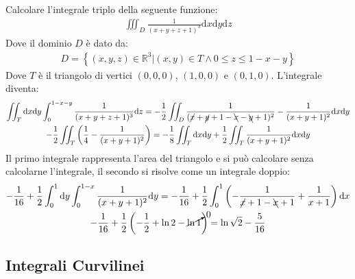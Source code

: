 \documentclass{article}
\newcommand{\df}{\mathrm{d}}
\numberwithin{equation}{subsection}
\begin{document}
Calcolare l'integrale triplo della seguente funzione:
\begin{gather*}
    \iiint_D\frac{1}{(x+y+z+1)^3}\df x\df y\df z
\end{gather*}
Dove il dominio $D$ è dato da:
\begin{gather*}
    D=\left\{(x,y,z)\in\mathbb{R}^3\big|(x,y)\in T\land0\leq z\leq 1-x-y\right\}
\end{gather*}
Dove $T$ è il triangolo di vertici $(0,0,0)$, $(1,0,0)$ e $(0,1,0)$. L'integrale diventa:
\begin{gather*}
    \iint_T\df x\df y\int_0^{1-x-y}\frac{1}{(x+y+z+1)^3}\df z=
    -\frac{1}{2}\iint_D\frac{1}{(\cancel{x}+\cancel{y}+1-\bcancel{x}-\bcancel{y}+1)^2}-\frac{1}{(x+y+1)^2}\df x\df y\\
    -\frac{1}{2}\iint_T\left(\frac{1}{4}-\frac{1}{(x+y+1)^2}\right)=-\frac{1}{8}\iint_T\df x\df y+\frac{1}{2}\iint_T\frac{1}{(x+y+1)^2}\df x\df y
\end{gather*}
Il primo integrale rappresenta l'area del triangolo e si può calcolare senza calcolarne l'integrale, il secondo si risolve come un integrale doppio: 
\begin{gather*}
    -\frac{1}{16}+\frac{1}{2}\int_0^1\df y\int_0^{1-x}\frac{1}{(x+y+1)^2}\df y=
    -\frac{1}{16}+\frac{1}{2}\int_0^1\left(-\frac{1}{\cancel{x}+1-\bcancel{x}+1}+\frac{1}{x+1}\right)\df x\\
    -\frac{1}{16}+\frac{1}{2}\left(-\frac{1}{2}+\ln2-\cancelto{0}{\ln1}\right)=\ln\sqrt{2}-\frac{5}{16}
\end{gather*}

\subsection{Integrali Curvilinei}
\end{document}
